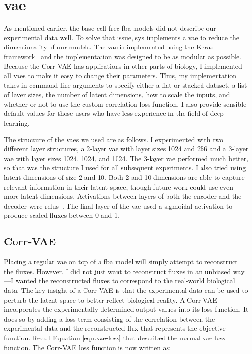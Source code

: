 \section{\gls{vae}} \label{sec:vae}
As mentioned earlier, the base cell-free \gls{fba} models did not describe our experimental data well.
To solve that issue, \gls{sys} implements a \gls{vae} to reduce the dimensionality of our models.
The \gls{vae} is implemented using the Keras framework~\cite{chollet2015keras} and the implementation was designed to be as modular as possible.
Because the Corr-VAE has applications in other parts of biology, I implemented all \glspl{vae} to make it easy to change their parameters.
Thus, my implementation takes in command-line arguments to specify either a flat or stacked dataset, a list of layer sizes, the number of latent dimensions, how to scale the inputs, and whether or not to use the custom correlation loss function.
I also provide sensible default values for those users who have less experience in the field of deep learning.

The structure of the \glspl{vae} we used are as follows.
I experimented with two different layer structures, a 2-layer \gls{vae} with layer sizes 1024 and 256 and a 3-layer \gls{vae} with layer sizes 1024, 1024, and 1024.
The 3-layer \gls{vae} performed much better, so that was the structure I used for all subsequent experiments.
I also tried using latent dimensions of size 2 and 10.
Both 2 and 10 dimensions are able to capture relevant information in their latent space, though future work could use even more latent dimensions.
Activations between layers of both the encoder and the decoder were \glspl{relu}~\cite{nair2010rectified}.
The final layer of the \gls{vae} used a sigmoidal activation to produce scaled fluxes between 0 and 1.

\subsection{Corr-VAE}
Placing a regular \gls{vae} on top of a \gls{fba} model will simply attempt to reconstruct the fluxes.
However, I did not just want to reconstruct fluxes in an unbiased way---I wanted the reconstructed fluxes to correspond to the real-world biological data.
The key insight of a Corr-VAE is that the experimental data can be used to perturb the latent space to better reflect biological reality.
A Corr-VAE incorporates the experimentally determined output values into its loss function.
It does so by adding a loss term consisting of the correlation between the experimental data and the reconstructed flux that represents the objective function.
Recall Equation \ref{eqn:vae-loss} that described the normal \gls{vae} loss function.
The Corr-VAE loss function is now written as:

